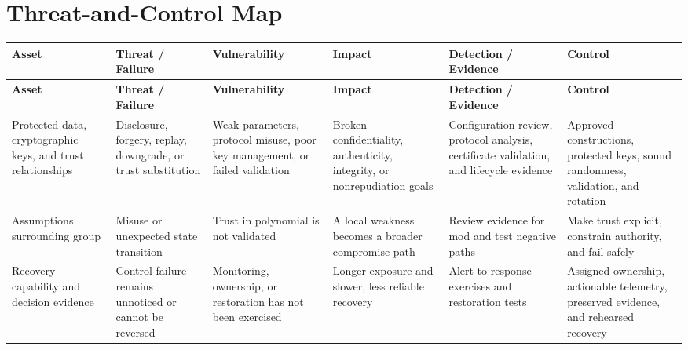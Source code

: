 \documentclass[11pt,letterpaper]{article}
\begin{document}
\section*{Threat-and-Control Map}
\begingroup\scriptsize\setlength{\tabcolsep}{2pt}
\begin{longtable}{>{\raggedright\arraybackslash}p{}>{\raggedright\arraybackslash}p{}>{\raggedright\arraybackslash}p{}>{\raggedright\arraybackslash}p{}>{\raggedright\arraybackslash}p{}>{\raggedright\arraybackslash}p{}}
\toprule\rowcolor{Navy}\color{white}\textbf{Asset} & \color{white}\textbf{Threat / Failure} & \color{white}\textbf{Vulnerability} & \color{white}\textbf{Impact} & \color{white}\textbf{Detection / Evidence} & \color{white}\textbf{Control}\\\midrule
\endfirsthead
\toprule\rowcolor{Navy}\color{white}\textbf{Asset} & \color{white}\textbf{Threat / Failure} & \color{white}\textbf{Vulnerability} & \color{white}\textbf{Impact} & \color{white}\textbf{Detection / Evidence} & \color{white}\textbf{Control}\\\midrule
\endhead
Protected data, cryptographic keys, and trust relationships & Disclosure, forgery, replay, downgrade, or trust substitution & Weak parameters, protocol misuse, poor key management, or failed validation & Broken confidentiality, authenticity, integrity, or nonrepudiation goals & Configuration review, protocol analysis, certificate validation, and lifecycle evidence & Approved constructions, protected keys, sound randomness, validation, and rotation\\\midrule
Assumptions surrounding group & Misuse or unexpected state transition & Trust in polynomial is not validated & A local weakness becomes a broader compromise path & Review evidence for mod and test negative paths & Make trust explicit, constrain authority, and fail safely\\\midrule
Recovery capability and decision evidence & Control failure remains unnoticed or cannot be reversed & Monitoring, ownership, or restoration has not been exercised & Longer exposure and slower, less reliable recovery & Alert-to-response exercises and restoration tests & Assigned ownership, actionable telemetry, preserved evidence, and rehearsed recovery\\\midrule
\bottomrule
\end{longtable}
\endgroup
\end{document}
